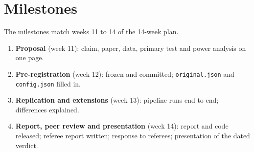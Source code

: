\section*{Milestones}

\noindent The milestones match weeks 11 to 14 of the 14-week plan.

\begin{enumerate}
  \item \textbf{Proposal} (week 11): claim, paper, data, primary test and power analysis on one page.
  \item \textbf{Pre-registration} (week 12): frozen and committed; \texttt{original.json} and \texttt{config.json} filled in.
  \item \textbf{Replication and extensions} (week 13): pipeline runs end to end; differences explained.
  \item \textbf{Report, peer review and presentation} (week 14): report and code released; referee report written; response to referees; presentation of the dated verdict.
\end{enumerate}

